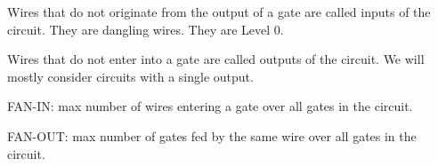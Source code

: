 
Wires that do not originate from the output of a gate are called inputs of the circuit. They are dangling wires. They are Level 0. 

Wires that do not enter into a gate are called outputs of the circuit.
We will mostly consider circuits with a single output.

FAN-IN: max number of wires entering a gate over all gates in the circuit. 

FAN-OUT: max number of gates fed by the same wire over all gates in the circuit. 
